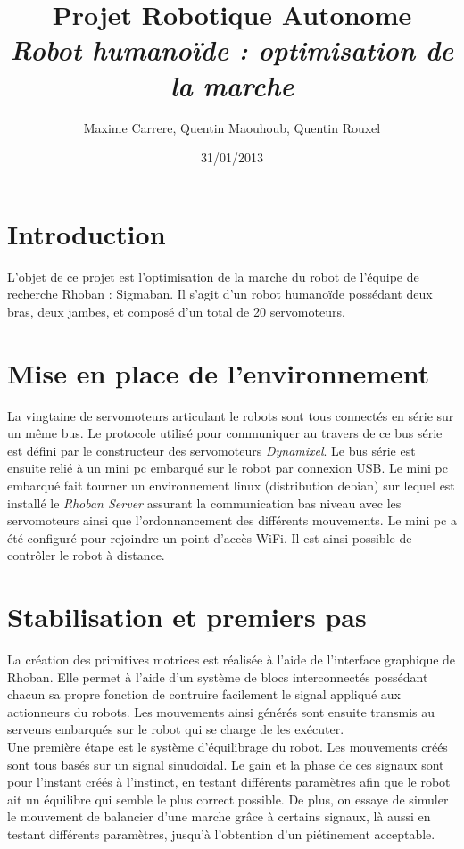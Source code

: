 \documentclass[11pt]{article}
\title{Projet Robotique Autonome\\
\textit{Robot humanoïde : optimisation de la marche}}
\author{Maxime Carrere, Quentin Maouhoub, Quentin Rouxel}
\date{31/01/2013}
\begin{document}
\maketitle

\section{Introduction}

L'objet de ce projet est l'optimisation de la marche du robot de l'équipe 
de recherche Rhoban : Sigmaban. Il s'agit d'un robot humanoïde possédant deux bras,
deux jambes, et composé d'un total de 20 servomoteurs.

\section{Mise en place de l'environnement}

La vingtaine de servomoteurs articulant le robots sont tous connectés en série sur un même 
bus. Le protocole utilisé pour communiquer au travers de ce bus série est défini par le
constructeur des servomoteurs \textit{Dynamixel}. Le bus série est ensuite relié à un mini pc
embarqué sur le robot par connexion USB. Le mini pc embarqué fait tourner un environnement linux
(distribution debian) sur lequel est installé le \textit{Rhoban Server} assurant la communication
bas niveau avec les servomoteurs ainsi que l'ordonnancement des différents mouvements. Le mini pc
a été configuré pour rejoindre un point d'accès WiFi. Il est ainsi possible de contrôler le robot
à distance.

\section{Stabilisation et premiers pas}

La création des primitives motrices est réalisée à l'aide de l'interface graphique de Rhoban.
Elle permet à l'aide d'un système de blocs interconnectés possédant chacun sa propre fonction
de contruire facilement le signal appliqué aux actionneurs du robots. Les mouvements ainsi générés
sont ensuite transmis au serveurs embarqués sur le robot qui se charge de les exécuter.\\

Une première étape est le système d'équilibrage du robot. 
Les mouvements créés sont tous basés sur un signal sinudoïdal. Le gain et la phase de ces signaux sont pour l'instant créés à l'instinct, en testant différents paramètres afin que le robot ait un équilibre qui semble le plus correct possible. De plus, on essaye de simuler le mouvement de balancier d'une marche grâce à certains signaux, là aussi en testant différents paramètres, jusqu'à l'obtention d'un piétinement acceptable.
\end{document}

